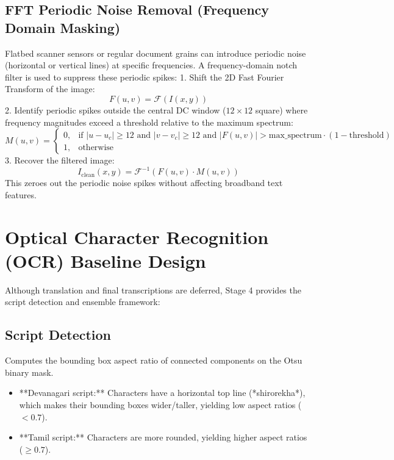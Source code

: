 \subsection{FFT Periodic Noise Removal (Frequency Domain Masking)}
Flatbed scanner sensors or regular document grains can introduce periodic noise (horizontal or vertical lines) at specific frequencies. A frequency-domain notch filter is used to suppress these periodic spikes:
1. Shift the 2D Fast Fourier Transform of the image:
\begin{equation}
F(u, v) = \mathcal{F}(I(x,y))
\end{equation}
2. Identify periodic spikes outside the central DC window ($12 \times 12$ square) where frequency magnitudes exceed a threshold relative to the maximum spectrum:
\begin{equation}
M(u, v) = \begin{cases} 0, & \text{if } |u - u_c| \ge 12 \text{ and } |v - v_c| \ge 12 \text{ and } |F(u,v)| > \text{max\_spectrum} \cdot (1 - \text{threshold}) \\ 1, & \text{otherwise} \end{cases}
\end{equation}
3. Recover the filtered image:
\begin{equation}
I_{\text{clean}}(x, y) = \mathcal{F}^{-1}(F(u, v) \cdot M(u, v))
\end{equation}
This zeroes out the periodic noise spikes without affecting broadband text features.

\section{Optical Character Recognition (OCR) Baseline Design}

Although translation and final transcriptions are deferred, Stage 4 provides the script detection and ensemble framework:

\subsection{Script Detection}
Computes the bounding box aspect ratio of connected components on the Otsu binary mask.
\begin{itemize}
	\item **Devanagari script:** Characters have a horizontal top line (*shirorekha*), which makes their bounding boxes wider/taller, yielding low aspect ratios ($< 0.7$).
	\item **Tamil script:** Characters are more rounded, yielding higher aspect ratios ($\ge 0.7$).
\end{itemize}

